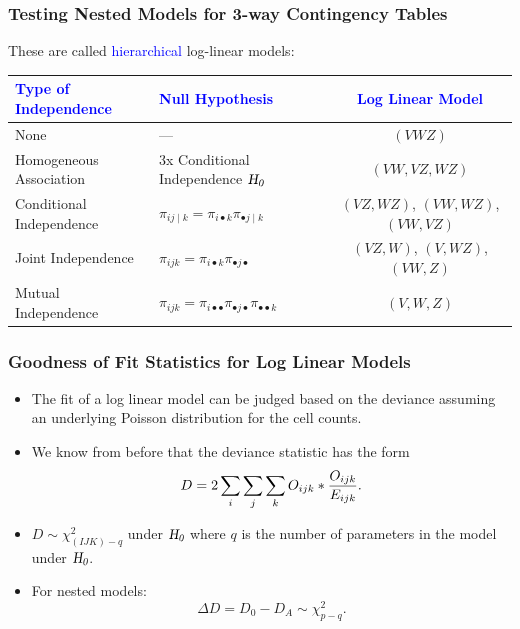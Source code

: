 \documentclass[oneside]{book}\usepackage[]{graphicx}\usepackage[svgnames]{xcolor}
\let\log\relax%
\newcommand{\HN}{\textsl{H}_{\textsl{0}}}%
\begin{document}
\subsubsection*{Testing Nested Models for 3-way Contingency Tables}
These are called \textcolor{Blue}{hierarchical} log-linear models:
\begin{table}[H]
    \centering
    \begin{tabular}{llc}
        \textcolor{Blue}{Type of Independence} & \textcolor{Blue}{Null Hypothesis}                                               & \textcolor{Blue}{Log Linear Model}    \\
        \midrule
        None                                   & ---                                                                             & $ (VWZ) $                             \\
        Homogeneous Association                & 3x Conditional Independence $ \HN $                                             & $ (VW,VZ,WZ) $                        \\
        Conditional Independence               & $ \pi_{ij\mid k}=\pi_{i\bullet k}\pi_{\bullet j\mid k} $                        & $ (VZ,WZ) $, $ (VW,WZ) $, $ (VW,VZ) $ \\
        Joint Independence                     & $ \pi_{ijk}=\pi_{i\bullet k}\pi_{\bullet j\bullet} $                            & $ (VZ,W) $, $ (V,WZ) $, $ (VW,Z) $    \\
        Mutual Independence                    & $ \pi_{ijk}=\pi_{i\bullet\bullet}\pi_{\bullet j\bullet}\pi_{\bullet\bullet k} $ & $ (V,W,Z) $                           \\
        \bottomrule
    \end{tabular}
\end{table}
\subsubsection*{Goodness of Fit Statistics for Log Linear Models}
\begin{itemize}
    \item The fit of a log linear model can be judged based on the deviance assuming an
          underlying Poisson distribution for the cell counts.
    \item We know from before that the deviance statistic has the form
          \[ D=2\sum_i\sum_j\sum_k O_{ijk}\log*{\frac{O_{ijk}}{E_{ijk}}}. \]
    \item $ D \sim \chi^2_{(IJK)-q} $ under $ \HN $ where $ q $ is the number of parameters in the model under $ \HN $.
    \item For nested models:
          \[ \Delta D=D_0-D_A \sim \chi^2_{p-q}. \]
\end{itemize}
\end{document}
